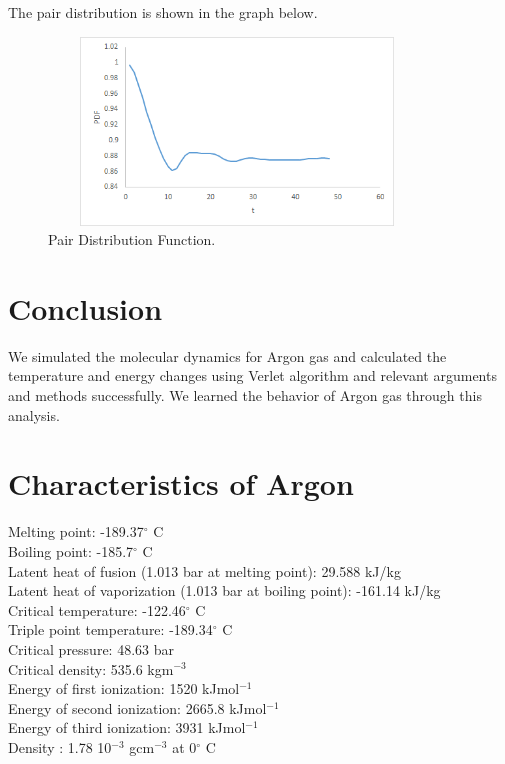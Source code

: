 \documentclass[]{article}
\begin{document}
The pair distribution is shown in the graph below.
\begin{figure}[H]
  \centering
  \includegraphics[width=10cm,height=5cm]{figures/PDF}
  \caption{\label{fig:PDF} Pair Distribution Function.}
\end{figure}

\section{Conclusion}
We simulated the molecular dynamics for Argon gas and calculated the temperature and energy changes using Verlet algorithm and relevant arguments and methods successfully. We learned the behavior of Argon gas through this analysis.

\appendix
\section{Characteristics of Argon}
Melting point: -189.37$^{\circ}$ C\\
Boiling point: -185.7$^{\circ}$ C\\
Latent heat of fusion (1.013 bar at melting point): 29.588 kJ/kg\\
Latent heat of vaporization (1.013 bar at boiling point): -161.14 kJ/kg\\
Critical temperature: -122.46$^{\circ}$ C\\
Triple point temperature: -189.34$^{\circ}$ C\\
Critical pressure: 48.63 bar\\
Critical density: 535.6 kgm$^{-3}$\\
Energy of first ionization: 1520 kJmol$^{-1}$\\
Energy of second ionization: 2665.8 kJmol$^{-1}$\\
Energy of third ionization: 3931 kJmol$^{-1}$\\
Density : 1.78 10$^{-3}$ gcm$^{-3}$ at 0$^{\circ}$ C\\
\end{document}
